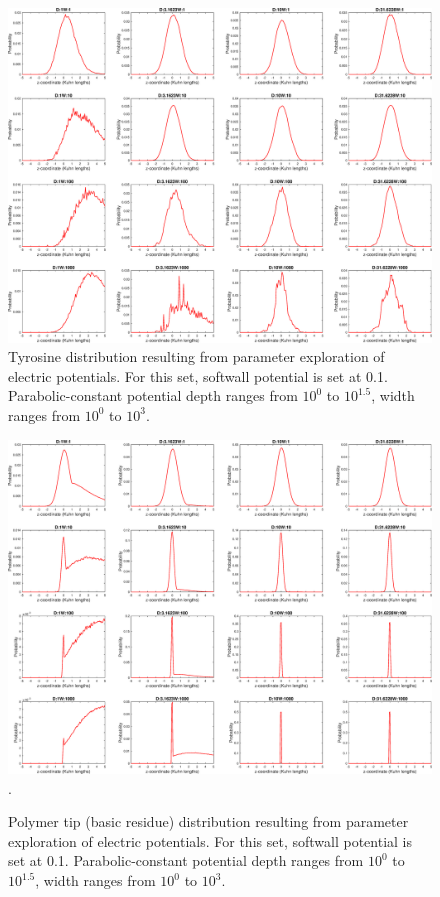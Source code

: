 \documentclass[../../AdvancementSummary.tex]{subfiles}
\begin{document}
\begin{figure}[H]
	\begin{center}
		\includegraphics[width=0.8\linewidth]{ResultsFigures/Electro/DistributioniSite2.eps}
	\end{center}
	\caption{Tyrosine distribution resulting from parameter exploration of electric potentials. For this set, softwall potential is set at 0.1. Parabolic-constant potential depth ranges from $10^0$ to $10^{1.5}$, width ranges from $10^0$ to $10^3$.\label{fig: iSiteDist}}
\end{figure}

\begin{figure}[H]
	\begin{center}
		\includegraphics[width=0.8\linewidth]{ResultsFigures/Electro/DistributioniSite7.eps}. 
	\end{center}
	\caption{Polymer tip (basic residue) distribution resulting from parameter exploration of electric potentials. For this set, softwall potential is set at 0.1. Parabolic-constant potential depth ranges from $10^0$ to $10^{1.5}$, width ranges from $10^0$ to $10^3$.\label{fig: tailDist}}
\end{figure}
\end{document}
